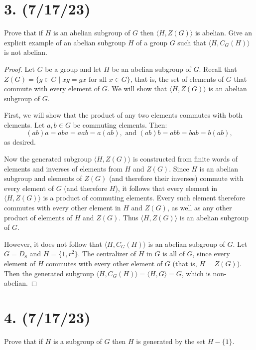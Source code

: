 \documentclass{article}
\begin{document}
\section*{3. (7/17/23)}

Prove that if $H$ is an abelian subgroup of $G$ then $\langle H, Z(G) \rangle$ is abelian. Give an explicit example of an abelian subgroup $H$ of a group $G$ such that $\langle H, C_G(H) \rangle$ is not abelian.

\begin{proof}
    Let $G$ be a group and let $H$ be an abelian subgroup of $G$. Recall that $Z(G) = \{ g \in G \mid xg = gx \text{ for all } x \in G \}$, that is, the set of elements of $G$ that commute with every element of $G$. We will show that $\langle H, Z(G) \rangle$ is an abelian subgroup of $G$.

    First, we will show that the product of any two elements commutes with both elements. Let $a, b \in G$ be commuting elements. Then:
    \begin{equation*}
        (ab)a = aba = aab = a(ab), \text{ and } (ab)b = abb = bab = b(ab),
    \end{equation*}
    as desired.

    Now the generated subgroup $\langle H, Z(G) \rangle$ is constructed from finite words of elements and inverses of elements from $H$ and $Z(G)$. Since $H$ is an abelian subgroup and elements of $Z(G)$ (and therefore their inverses) commute with every element of $G$ (and therefore $H$), it follows that every element in $\langle H, Z(G) \rangle$ is a product of commuting elements. Every such element therefore commutes with every other element in $H$ and $Z(G)$, as well as any other product of elements of $H$ and $Z(G)$. Thus $\langle H, Z(G) \rangle$ is an abelian subgroup of $G$.

    However, it does not follow that $\langle H, C_G(H) \rangle$ is an abelian subgroup of $G$. Let $G = D_8$ and $H = \{ 1, r^2 \}$. The centralizer of $H$ in $G$ is all of $G$, since every element of $H$ commutes with every other element of $G$ (that is, $H = Z(G)$). Then the generated subgroup $\langle H, C_G(H) \rangle = \langle H, G \rangle = G$, which is non-abelian.
\end{proof}

\section*{4. (7/17/23)}

Prove that if $H$ is a subgroup of $G$ then $H$ is generated by the set $H - \{ 1 \}$.
\end{document}
